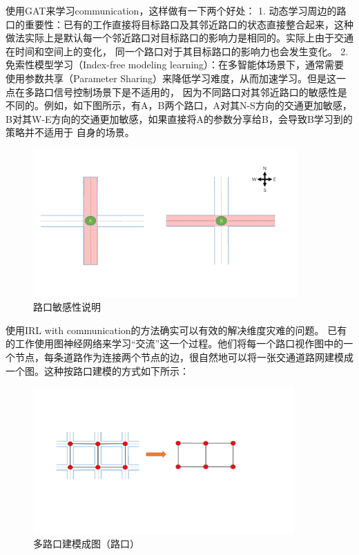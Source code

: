 使用GAT来学习communication，这样做有一下两个好处：
1. 动态学习周边的路口的重要性：已有的工作直接将目标路口及其邻近路口的状态直接整合起来，这种做法实际上是默认每一个邻近路口对目标路口的影响力是相同的。实际上由于交通在时间和空间上的变化，
同一个路口对于其目标路口的影响力也会发生变化。
2. 免索性模型学习（Index-free modeling learning）：在多智能体场景下，通常需要使用参数共享（Parameter Sharing）来降低学习难度，从而加速学习。但是这一点在多路口信号控制场景下是不适用的，
因为不同路口对其邻近路口的敏感性是不同的。例如，如下图所示，有A，B两个路口，A对其N-S方向的交通更加敏感，B对其W-E方向的交通更加敏感，如果直接将A的参数分享给B，会导致B学习到的策略并不适用于
自身的场景。
\begin{figure}[htb]
  \includegraphics[width=0.9\textwidth]{ppt/index-free.pdf}
  \caption{路口敏感性说明}
  \label{fig:index-free}
\end{figure}

使用IRL with communication的方法确实可以有效的解决维度灾难的问题。
已有的工作使用图神经网络来学习“交流”这一个过程。他们将每一个路口视作图中的一个节点，每条道路作为连接两个节点的边，很自然地可以将一张交通道路网建模成一个图。这种按路口建模的方式如下所示：
\begin{figure}[htb]
  \includegraphics[width=10cm]{ppt/network-graph.pdf}
  \caption{多路口建模成图（路口）}
  \label{fig:network-graph-old}
\end{figure}


